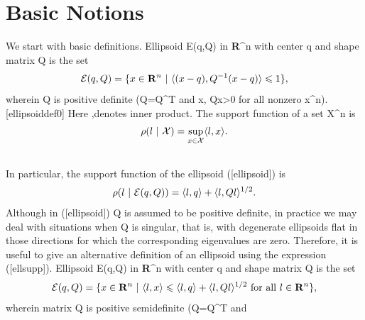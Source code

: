 \documentclass[letterpaper,10pt,english]{sphinxmanual}
\begin{document}
\section{Basic Notions}
\label{chap_ellcalc:basic-notions}
We start with basic definitions. Ellipsoid {\mathcal E}(q,Q) in
{\bf R}^n with center q and shape matrix Q is
the set
\begin{gather}
\begin{split}{\mathcal E}(q,Q) = \{ x \in {\bf R}^n ~|~ \langle (x-q), Q^{-1}(x-q)\rangle\leqslant1 \},
\label{ellipsoid}\end{split}\notag
\end{gather}
wherein Q is positive definite (Q=Q^T and
\langle x, Qx\rangle>0 for all nonzero x^n).
{[}ellipsoiddef0{]} Here \langle\cdot,\cdot\rangle denotes inner
product. The support function of a set
{\mathcal X}^n is
\begin{gather}
\begin{split}\rho(l~|~{\mathcal X}) = \sup_{x\in{\mathcal X}} \langle l,x\rangle.\end{split}\notag\\\begin{split}\end{split}\notag
\end{gather}
In particular, the support function of the ellipsoid ({[}ellipsoid{]}) is
\begin{gather}
\begin{split}\rho(l~|~{\mathcal E}(q,Q)) = \langle l, q\rangle + \langle l, Ql\rangle^{1/2}.
\label{ellsupp}\end{split}\notag
\end{gather}
Although in ({[}ellipsoid{]}) Q is assumed to be positive definite,
in practice we may deal with situations when Q is singular, that
is, with degenerate ellipsoids flat in those directions for which the
corresponding eigenvalues are zero. Therefore, it is useful to give an
alternative definition of an ellipsoid using the expression ({[}ellsupp{]}).
Ellipsoid {\mathcal E}(q,Q) in {\bf R}^n with center
q and shape matrix Q is the set
\begin{gather}
\begin{split}{\mathcal E}(q,Q) = \{ x \in {\bf R}^n ~|~
\langle l,x\rangle\leqslant\langle l,q\rangle + \langle l,Ql\rangle^{1/2}
\mbox{ for all } l\in{\bf R}^n \},
\label{ellipsoid2}\end{split}\notag
\end{gather}
wherein matrix Q is positive semidefinite (Q=Q^T and
\end{document}
